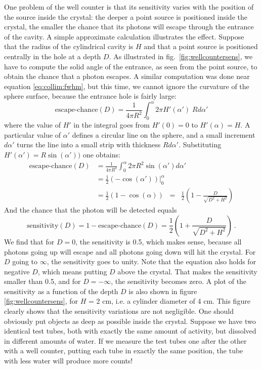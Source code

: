 \documentclass[11pt,oneside]{book}
\begin{document}
One problem of the well counter is that its sensitivity varies with
the position of the source inside the crystal: the deeper a point
source is positioned inside the crystal, the smaller the chance that
its photons will escape through the entrance of the cavity. A simple
approximate calculation illustrates the effect. Suppose that the
radius of the cylindrical cavity is $H$ and that a point source is
positioned centrally in the hole at a depth $D$. As illustrated in
fig.\ \ref{fig:wellcountersens}, we have to compute the solid angle of
the entrance, as seen from the point source, to obtain the chance that
a photon escapes. A similar computation was done near equation
\eqref{eq:collim:fwhm}, but this time, we cannot ignore the curvature
of the sphere surface, because the entrance hole is fairly large:
\begin{equation}
 \mbox{escape-chance}(D)
  = \frac{1}{4\pi R^2}\int_0^\alpha 2\pi H'(\alpha') \; R d\alpha'
\end{equation}
where the value of $H'$ in the integral goes from $H'(0) = 0$ to
$H'(\alpha) = H$. A particular value of $\alpha'$ defines a circular
line on the sphere, and a small increment $d \alpha'$ turns the line
into a small strip with thickness $R d \alpha'$.
%
Substituting $H'(\alpha') = R \sin(\alpha'))$ one
obtains:
\begin{align}
  \mbox{escape-chance}(D)
 &= \frac{1}{4\pi R^2}\int_0^\alpha 2\pi R^2 \sin(\alpha') d\alpha' \nonumber\\
 &=  \frac{1}{2} \left. (- \cos(\alpha')) \right|_0^\alpha \nonumber\\
 &=  \frac{1}{2} (1 - \cos(\alpha)) 
     \;\; = \;\; \frac{1}{2}\left(1 - \frac{D}{\sqrt{D^2 + H^2}}\right)
     \label{eq:wellcounter}
\end{align}
And the chance that the photon will be detected equals
\begin{equation}
  \mbox{sensitivity}(D) = 1 - \mbox{escape-chance}(D) = \frac{1}{2}\left(1 + \frac{D}{\sqrt{D^2 + H^2}}\right) \ . 
  \label{eq:wellcountersens}
\end{equation}
We find that for $D = 0$, the sensitivity is 0.5, which makes sense,
because all photons going up will escape and all photons going down
will hit the crystal. For $D$ going to $\infty$, the sensitivity goes
to unity. Note that the equation also holds for negative $D$, which
means putting $D$ above the crystal. That makes the sensitivity
smaller than 0.5, and for $D = -\infty$, the sensitivity becomes zero.
A plot of the sensitivity as a function of the depth $D$ is also shown
in figure \ref{fig:wellcountersens}, for $H$ = 2 cm, i.e. a cylinder
diameter of 4 cm. This figure clearly shows that the sensitivity
variations are not negligible. One should obviously put objects as
deep as possible inside the crystal. Suppose we have two identical
test tubes, both with exactly the same amount of activity, but
dissolved in different amounts of water. If we measure the test tubes
one after the other with a well counter, putting each tube in exactly
the same position, the tube with less water will produce more counts!
\end{document}
